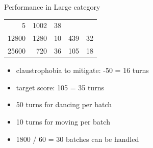 \begin{frame}{Performance in Large category}
\begin{longtable}[c]{@{}rrrrr@{}}
\begin{minipage}[t]{0.17\columnwidth}\raggedleft\strut
5
\strut\end{minipage} &
\begin{minipage}[t]{0.18\columnwidth}\raggedleft\strut
1002
\strut\end{minipage} &
\begin{minipage}[t]{0.23\columnwidth}\raggedleft\strut
38
\strut\end{minipage}\tabularnewline
\begin{minipage}[t]{0.12\columnwidth}\raggedleft\strut
12800
\strut\end{minipage} &
\begin{minipage}[t]{0.16\columnwidth}\raggedleft\strut
1280
\strut\end{minipage} &
\begin{minipage}[t]{0.17\columnwidth}\raggedleft\strut
10
\strut\end{minipage} &
\begin{minipage}[t]{0.18\columnwidth}\raggedleft\strut
439
\strut\end{minipage} &
\begin{minipage}[t]{0.23\columnwidth}\raggedleft\strut
32
\strut\end{minipage}\tabularnewline
\begin{minipage}[t]{0.12\columnwidth}\raggedleft\strut
25600
\strut\end{minipage} &
\begin{minipage}[t]{0.16\columnwidth}\raggedleft\strut
720
\strut\end{minipage} &
\begin{minipage}[t]{0.17\columnwidth}\raggedleft\strut
36
\strut\end{minipage} &
\begin{minipage}[t]{0.18\columnwidth}\raggedleft\strut
105
\strut\end{minipage} &
\begin{minipage}[t]{0.23\columnwidth}\raggedleft\strut
18
\strut\end{minipage}\tabularnewline
\bottomrule
\end{longtable}

\begin{itemize}
\tightlist
\item
  claustrophobia to mitigate: -50 = 16 turns
\item
  target score: 105 = 35 turns
\item
  50 turns for dancing per batch
\item
  10 turns for moving per batch
\item
  1800 / 60 = 30 batches can be handled
\end{itemize}

\end{frame}
